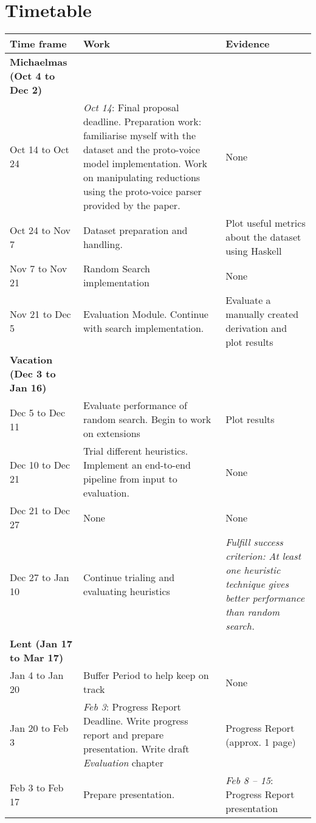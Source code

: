 \documentclass{article}
\begin{document}
\section{Timetable}
\setlength{\extrarowheight}{.4em}
{\small \begin{tabularx}{\textwidth}{@{} p{125pt} X p{110pt} @{}}
  \toprule
  Time frame       & Work & Evidence   \\ 
  \midrule
  \bfseries{Michaelmas} (Oct 4 to Dec 2)  & &    \\ 
  Oct 14 to Oct 24 & \textit{Oct 14}: Final proposal deadline.
                      Preparation work: familiarise myself with the dataset and the proto-voice model implementation.   
                      Work on manipulating reductions using the proto-voice parser provided by the paper. & None       \\
  Oct 24 to Nov 7 &  Dataset preparation and handling. & Plot useful metrics about the dataset using Haskell        \\
  Nov 7 to Nov 21 &  Random Search implementation &   None     \\
  Nov 21 to Dec 5 &  Evaluation Module. Continue with search implementation. & Evaluate a manually created derivation and plot results \\
  \midrule
  \bfseries{Vacation} (Dec 3 to Jan 16)  & &    \\ 
  Dec 5 to Dec 11 &  Evaluate performance of random search. Begin to work on extensions & Plot results       \\
  Dec 10 to Dec 21 &  Trial different heuristics. Implement an end-to-end pipeline from input to evaluation. & None    \\
  Dec 21 to Dec 27 &  None & None    \\
  Dec 27 to Jan 10 &  Continue trialing and evaluating heuristics & \textit{Fulfill success criterion: At least one heuristic technique gives better performance than random search.}\\
  \midrule
  \bfseries{Lent} (Jan 17 to  Mar 17)   &  &    \\ 
  Jan 4 to Jan 20 &  Buffer Period to help keep on track& None       \\
  Jan 20 to Feb 3 
                  &
                \textit{Feb 3}: Progress Report Deadline.
                  Write progress report and prepare presentation. 
                  Write draft \textit{Evaluation} chapter  & Progress Report (approx. 1 page)      \\
                  Feb 3 to Feb 17 & Prepare presentation. & \textit{Feb 8 -- 15}: Progress Report presentation       \\

\end{tabularx}}
\end{document}
